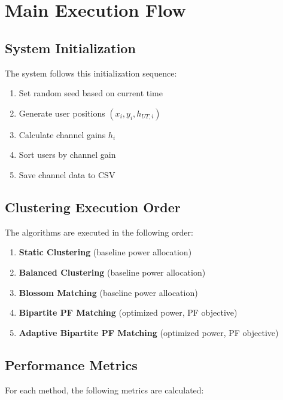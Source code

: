 \documentclass[12pt,a4paper]{article}
\begin{document}
\section{Main Execution Flow}

\subsection{System Initialization}

The system follows this initialization sequence:

\begin{enumerate}
    \item Set random seed based on current time
    \item Generate user positions $(x_i, y_i, h_{UT,i})$
    \item Calculate channel gains $h_i$
    \item Sort users by channel gain
    \item Save channel data to CSV
\end{enumerate}

\subsection{Clustering Execution Order}

The algorithms are executed in the following order:

\begin{enumerate}
    \item \textbf{Static Clustering} (baseline power allocation)
    \item \textbf{Balanced Clustering} (baseline power allocation)
    \item \textbf{Blossom Matching} (baseline power allocation)
    \item \textbf{Bipartite PF Matching} (optimized power, PF objective)
    \item \textbf{Adaptive Bipartite PF Matching} (optimized power, PF objective)
\end{enumerate}

\subsection{Performance Metrics}

For each method, the following metrics are calculated:
\end{document}
